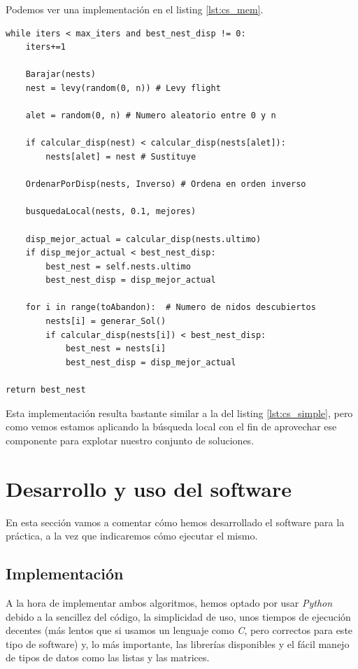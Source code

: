 Podemos ver una implementación en el listing \ref{lst:cs_mem}.

\begin{lstlisting}[frame=single, caption={Hibridación Cuckoo Search y memético}, captionpos=b, label=lst:cs_mem]
while iters < max_iters and best_nest_disp != 0:
    iters+=1

    Barajar(nests)     
    nest = levy(random(0, n)) # Levy flight

    alet = random(0, n) # Numero aleatorio entre 0 y n

    if calcular_disp(nest) < calcular_disp(nests[alet]):
        nests[alet] = nest # Sustituye
    
    OrdenarPorDisp(nests, Inverso) # Ordena en orden inverso
	
	busquedaLocal(nests, 0.1, mejores)
	
    disp_mejor_actual = calcular_disp(nests.ultimo)
    if disp_mejor_actual < best_nest_disp:
        best_nest = self.nests.ultimo
        best_nest_disp = disp_mejor_actual

    for i in range(toAbandon):	# Numero de nidos descubiertos
        nests[i] = generar_Sol()
        if calcular_disp(nests[i]) < best_nest_disp:
            best_nest = nests[i]
            best_nest_disp = disp_mejor_actual
            
return best_nest
\end{lstlisting}

Esta implementación resulta bastante similar a la del listing \ref{lst:cs_simple}, pero como vemos estamos aplicando la búsqueda local con el fin de aprovechar ese componente para explotar nuestro conjunto de soluciones.

\newpage

\section{Desarrollo y uso del software}

En esta sección vamos a comentar cómo hemos desarrollado el software para la práctica, a la vez que indicaremos cómo ejecutar el mismo.


\subsection{Implementación}

A la hora de implementar ambos algoritmos, hemos optado por usar \textit{Python} debido a la sencillez del código, la simplicidad de uso, unos tiempos de ejecución decentes (más lentos que si usamos un lenguaje como \textit{C}, pero correctos para este tipo de software) y, lo más importante, las librerías disponibles y el fácil manejo de tipos de datos como las listas y las matrices.

